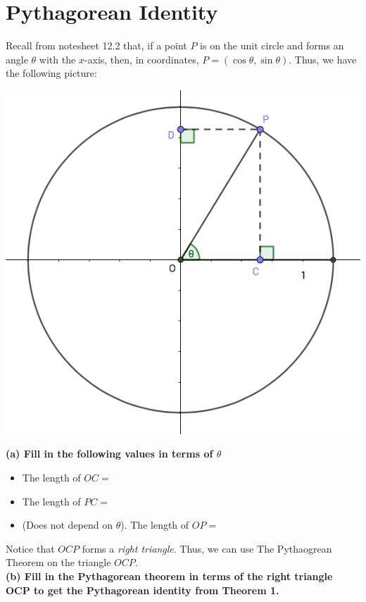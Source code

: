 \documentclass[12pt, a4paper]{article}
\begin{document}
\section{Pythagorean Identity}
\begin{ex}
Recall from notesheet 12.2 that, if a point \(P\) is on the unit
circle and forms an angle \(\theta\) with the \(x\)-axis, then, in
coordinates, \(P = (\cos \theta, \sin \theta)\). Thus, we have the
following picture:\\
\begin{minipage}{0.6\linewidth}
\includegraphics[scale=0.5]{images/unit-circle-with-emphasis}  
\end{minipage}
\begin{minipage}{0.4\linewidth}
  \textbf{(a) Fill in the following values in terms of \(\theta\)}
  \begin{itemize}
  \item The length of \(OC = \)
  \item The length of \(PC = \)
  \item (Does not depend on \(\theta\)). The length of \(OP = \)
  \end{itemize}
\end{minipage}
Notice that \(OCP\) forms a \emph{right triangle}. Thus, we can use
The Pythaogrean Theorem on the triangle \(OCP\).\\
\textbf{(b) Fill in the Pythagorean theorem in terms of the right
  triangle OCP to get the Pythagorean identity from Theorem 1.}
\end{ex}
\end{document}
